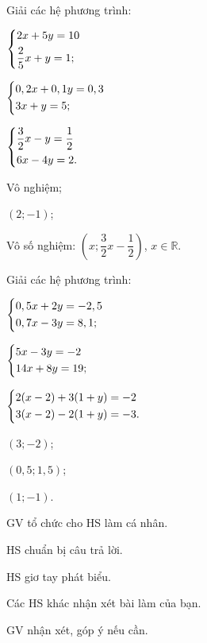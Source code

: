 \begin{baitap}[1.23]
	Giải các hệ phương trình:
	\begin{listEX}
		\item $\left\{\begin{aligned}&2x + 5y = 10 \\ &\dfrac{2}{5}x + y = 1;\end{aligned}\right.$
		\item $\left\{\begin{aligned}&0,2x + 0,1y = 0,3 \\ &3x + y = 5;\end{aligned}\right.$
		\item $\left\{\begin{aligned}&\dfrac{3}{2}x - y = \dfrac{1}{2} \\ &6x - 4y = 2.\end{aligned}\right.$
	\end{listEX}
	\doicot
	\huongdan
	\begin{listEX}
		\item Vô nghiệm;
		\item $(2;-1)$;
		\item Vô số nghiệm: $\left(x;\dfrac{3}{2}x-\dfrac{1}{2}\right)$, $x\in\mathbb{R}$.
	\end{listEX}
\end{baitap}

\begin{baitap}[1.24]
	Giải các hệ phương trình:
	\begin{listEX}
		\item $\left\{\begin{aligned}&0,5x + 2y = -2,5 \\ &0,7x - 3y = 8,1;\end{aligned}\right.$
		\item $\left\{\begin{aligned}&5x - 3y = -2 \\ &14x + 8y = 19;\end{aligned}\right.$
		\item $\left\{\begin{aligned}&2(x - 2) + 3(1 + y) = -2 \\ &3(x - 2) - 2(1 + y) = -3.\end{aligned}\right.$
	\end{listEX}
	\doicot
	\huongdan
	\begin{listEX}
		\item $(3;-2)$;
		\item $(0{,}5;1{,}5)$;
		\item $(1;-1)$.
	\end{listEX}
\end{baitap}

\tochucthuchien

\begin{tcth}[baitap={từ 1.19 đến 1.22}]
	\buocmot
	\item GV tổ chức cho HS làm cá nhân.
	\buochai
	\item HS chuẩn bị câu trả lời.
	\buocba
	\item HS giơ tay phát biểu.
	\item Các HS khác nhận xét bài làm của bạn.
	\buocbon
	\item GV nhận xét, góp ý nếu cần.
\end{tcth}


